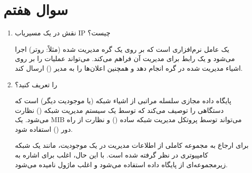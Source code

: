 \section{سوال هفتم}

\begin{enumerate}
	\item 
	نقش  در یک مسیریاب IP چیست؟
	
	\begin{qsolve}
	یک عامل نرم‌افزاری است که بر روی یک گره مدیریت شده (مثلاً: روتر) اجرا می‌شود و یک رابط برای مدیریت آن فراهم می‌کند. می‌تواند عملیات را بر روی اشیاء مدیریت شده در گره انجام دهد و همچنین اعلان‌ها را به مدیر () ارسال کند.
	\end{qsolve}
	
	
	
	
	\item 
	  را تعریف کنید؟

	\begin{qsolve}
	پایگاه داده مجازی سلسله مراتبی از اشیاء شبکه (یا موجودیت دیگر) است که دستگاهی را توصیف می‌کند که توسط یک سیستم مدیریت شبکه () نظارت می‌شود. یک MIB می‌تواند توسط پروتکل مدیریت شبکه ساده () و نظارت از راه دور () استفاده شود.
	
	\lr{MIB}
	برای ارجاع به مجموعه کاملی از اطلاعات مدیریت در یک موجودیت، مانند یک شبکه کامپیوتری در نظر گرفته شده است. با این حال، اغلب برای اشاره به زیرمجموعه‌ای از پایگاه داده استفاده می‌شود و اغلب ماژول  نامیده می‌شود.
	\end{qsolve}


\end{enumerate}
